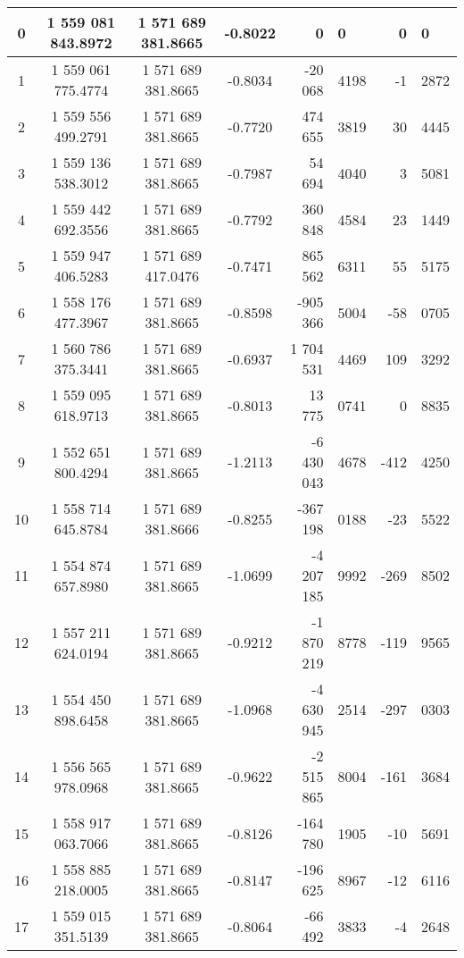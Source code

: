 \begin{center}
\begin{longtable}{|c|c|c|c|r@{.}l|r@{.}l|}
0  &  1 559 081 843.8972  & 1 571 689 381.8665   &  -0.8022  &           0 & 0     &     0 & 0    \\ \hline
1  &  1 559 061 775.4774  & 1 571 689 381.8665   &  -0.8034  &     -20 068 & 4198  &    -1 & 2872 \\ \hline
2  &  1 559 556 499.2791  & 1 571 689 381.8665   &  -0.7720  &     474 655 & 3819  &    30 & 4445 \\ \hline
3  &  1 559 136 538.3012  & 1 571 689 381.8665   &  -0.7987  &      54 694 & 4040  &     3 & 5081 \\ \hline
4  &  1 559 442 692.3556  & 1 571 689 381.8665   &  -0.7792  &     360 848 & 4584  &    23 & 1449 \\ \hline
5  &  1 559 947 406.5283  & 1 571 689 417.0476   &  -0.7471  &     865 562 & 6311  &    55 & 5175 \\ \hline
6  &  1 558 176 477.3967  & 1 571 689 381.8665   &  -0.8598  &    -905 366 & 5004  &   -58 & 0705 \\ \hline
7  &  1 560 786 375.3441  & 1 571 689 381.8665   &  -0.6937  &   1 704 531 & 4469  &   109 & 3292 \\ \hline
8  &  1 559 095 618.9713  & 1 571 689 381.8665   &  -0.8013  &      13 775 & 0741  &     0 & 8835 \\ \hline
9  &  1 552 651 800.4294  & 1 571 689 381.8665   &  -1.2113  &  -6 430 043 & 4678  &  -412 & 4250 \\ \hline
10 &  1 558 714 645.8784  & 1 571 689 381.8666   &  -0.8255  &    -367 198 & 0188  &   -23 & 5522 \\ \hline
11 &  1 554 874 657.8980  & 1 571 689 381.8665   &  -1.0699  &  -4 207 185 & 9992  &  -269 & 8502 \\ \hline
12 &  1 557 211 624.0194  & 1 571 689 381.8665   &  -0.9212  &  -1 870 219 & 8778  &  -119 & 9565 \\ \hline
13 &  1 554 450 898.6458  & 1 571 689 381.8665   &  -1.0968  &  -4 630 945 & 2514  &  -297 & 0303 \\ \hline
14 &  1 556 565 978.0968  & 1 571 689 381.8665   &  -0.9622  &  -2 515 865 & 8004  &  -161 & 3684 \\ \hline
15 &  1 558 917 063.7066  & 1 571 689 381.8665   &  -0.8126  &    -164 780 & 1905  &   -10 & 5691 \\ \hline
16 &  1 558 885 218.0005  & 1 571 689 381.8665   &  -0.8147  &    -196 625 & 8967  &   -12 & 6116 \\ \hline
17 &  1 559 015 351.5139  & 1 571 689 381.8665   &  -0.8064  &     -66 492 & 3833  &    -4 & 2648 \\ \hline

\end{longtable}
\end{center}
